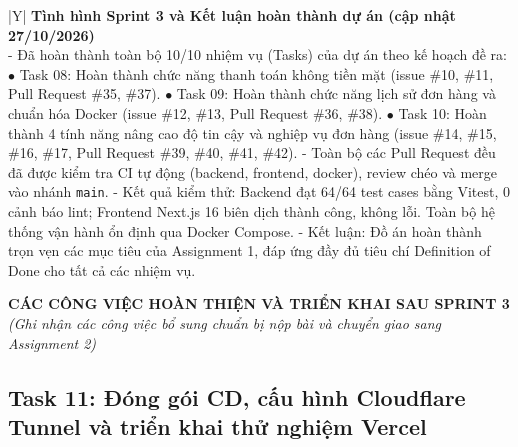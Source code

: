 \documentclass[12pt, a4paper]{article}
\begin{document}
\begin{tabularx}{\textwidth}{|Y|}
    \hline
    \textbf{Tình hình Sprint 3 và Kết luận hoàn thành dự án (cập nhật 27/10/2026)} \\
    \hline
    - Đã hoàn thành toàn bộ 10/10 nhiệm vụ (Tasks) của dự án theo kế hoạch đề ra: \newline
    \quad $\bullet$ Task 08: Hoàn thành chức năng thanh toán không tiền mặt (issue \#10, \#11, Pull Request \#35, \#37). \newline
    \quad $\bullet$ Task 09: Hoàn thành chức năng lịch sử đơn hàng và chuẩn hóa Docker (issue \#12, \#13, Pull Request \#36, \#38). \newline
    \quad $\bullet$ Task 10: Hoàn thành 4 tính năng nâng cao độ tin cậy và nghiệp vụ đơn hàng (issue \#14, \#15, \#16, \#17, Pull Request \#39, \#40, \#41, \#42). \newline
    - Toàn bộ các Pull Request đều đã được kiểm tra CI tự động (backend, frontend, docker), review chéo và merge vào nhánh \texttt{main}. \newline
    - Kết quả kiểm thử: Backend đạt 64/64 test cases bằng Vitest, 0 cảnh báo lint; Frontend Next.js 16 biên dịch thành công, không lỗi. Toàn bộ hệ thống vận hành ổn định qua Docker Compose. \newline
    - Kết luận: Đồ án hoàn thành trọn vẹn các mục tiêu của Assignment 1, đáp ứng đầy đủ tiêu chí Definition of Done cho tất cả các nhiệm vụ. \\
    \hline
\end{tabularx}

\vspace{0.8cm}

\begin{center}
    \Large\textbf{CÁC CÔNG VIỆC HOÀN THIỆN VÀ TRIỂN KHAI SAU SPRINT 3}\\
    \large\textit{(Ghi nhận các công việc bổ sung chuẩn bị nộp bài và chuyển giao sang Assignment 2)}
\end{center}

\vspace{0.4cm}

\subsection*{Task 11: Đóng gói CD, cấu hình Cloudflare Tunnel và triển khai thử nghiệm Vercel}
\end{document}
